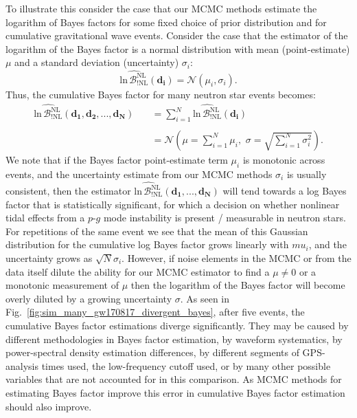 To illustrate this consider the case that our MCMC methods estimate the logarithm of Bayes factors for some fixed choice of prior distribution and for cumulative gravitational wave events. Consider the case that the estimator of the logarithm of the Bayes factor is a normal distribution with mean (point-estimate) $\mu$ and a standard deviation (uncertainty) $\sigma_i$:
\begin{equation}
    \widehat{\mathrm{ln} \, \mathcal{B}^{\mathrm{NL}}_{\mathrm{!NL}}}(\mathbf{d_i}) = \mathcal{N}(\mu_i, \sigma_i).
\end{equation}
Thus, the cumulative Bayes factor for many neutron star events becomes:
\begin{equation}
    \begin{array}{ll}
    \widehat{\mathrm{ln} \, \mathcal{B}^{\mathrm{NL}}_{\mathrm{!NL}}}(\mathbf{d_1}, \mathbf{d_2}, ..., \mathbf{d_N}) &\quad = \sum \limits_{i=1}^{N} \widehat{\mathrm{ln} \, \mathcal{B}^{\mathrm{NL}}_{\mathrm{!NL}}}(\mathbf{d_i}) \\ \\
    &\quad = \mathcal{N}\left(\mu = \sum \limits_{i=1}^{N} \mu_i, \, \, \sigma = \sqrt{\sum \limits_{i=1}^{N} \sigma_i^2}\right).
    \end{array}
\end{equation}
We note that if the Bayes factor point-estimate term $\mu_i$ is monotonic across events, and the uncertainty estimate from our MCMC methods $\sigma_i$ is usually consistent, then the estimator $\widehat{\mathrm{ln} \, \mathcal{B}^{\mathrm{NL}}_{\mathrm{!NL}}}(\mathbf{d_1}, ..., \mathbf{d_N})$ will tend towards a log Bayes factor that is statistically significant, for which a decision on whether nonlinear tidal effects from a $p$-$g$ mode instability is present / measurable in neutron stars.  For repetitions of the same event we see that the mean of this Gaussian distribution for the cumulative log Bayes factor grows linearly with $mu_i$, and the uncertainty grows as $\sqrt{N} \sigma_i$. However, if noise elements in the MCMC or from the data itself dilute the ability for our MCMC estimator to find a $\mu \neq 0$ or a monotonic measurement of $\mu$ then the logarithm of the Bayes factor will become overly diluted by a growing uncertainty $\sigma$.  As seen in Fig.~\ref{fig:sim_many_gw170817_divergent_bayes}, after five events, the cumulative Bayes factor estimations diverge significantly. They may be caused by different methodologies in Bayes factor estimation, by waveform systematics, by power-spectral density estimation differences, by different segments of GPS-analysis times used, the low-frequency cutoff used, or by many other possible variables that are not accounted for in this comparison. As MCMC methods for estimating Bayes factor improve this error in cumulative Bayes factor estimation should also improve.

